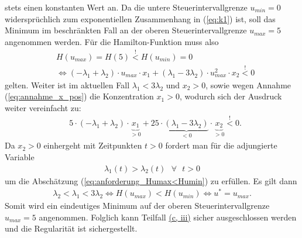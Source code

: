 stets einen konstanten Wert an. Da die untere Steuerintervallgrenze $u_{min} = 0$ widersprüchlich zum exponentiellen Zusammenhang in (\ref{eq:k1}) ist, soll das Minimum im beschränkten Fall an der oberen Steuerintervallgrenze $u_{max} = 5$ angenommen werden. Für die Hamilton-Funktion muss also
\begin{align}
	& H(u_{max}) = H(5) \overset{!}{<} H(u_{min}) = 0 \nonumber \\
	& \Leftrightarrow (-\lambda_1 + \lambda_2) \cdot u_{max} \cdot x_1 + (\lambda_1 - 3\lambda_2) \cdot u_{max}^2 \cdot x_2 \overset{!}{<} 0 
\end{align}
gelten. Weiter ist im aktuellen Fall $\lambda_1 < 3\lambda_2$ und $x_2 > 0$, sowie wegen Annahme (\ref{eq:annahme_x_pos}) die Konzentration $x_1 > 0$, wodurch sich der Ausdruck weiter vereinfacht zu:
\begin{align}
	&5 \cdot (-\lambda_1 + \lambda_2) \cdot \underbrace{x_1}_{>0} + 25 \cdot \underbrace{(\lambda_1 - 3\lambda_2)}_{<0}  \cdot \underbrace{x_2}_{>0} \overset{!}{<} 0. \label{eq:anforderung_Humax<Humin}
\end{align}
Da $x_2>0$ einhergeht mit Zeitpunkten $t>0$ fordert man für die adjungierte Variable
\begin{align}
	\lambda_1(t) > \lambda_2(t) \text{ } \forall \text{ } t>0 
	\label{eq:anforderung_lambda2<lambda1_t>0}
\end{align}
um die Abschätzung (\ref{eq:anforderung_Humax<Humin}) zu erfüllen. Es gilt dann
\begin{align}
\lambda_2 < \lambda_1 < 3\lambda_2 
\Leftrightarrow H(u_{max}) < H(u_{min}) 
\Leftrightarrow u^* = u_{max}.
\end{align}
%
Somit wird ein eindeutiges Minimum auf der oberen Steuerintervallgrenze $u_{max} = 5$ angenommen. Folglich kann Teilfall \hyperref[item:Fall2c]{(c, iii)} sicher ausgeschlossen werden und die Regularität ist sichergestellt.

